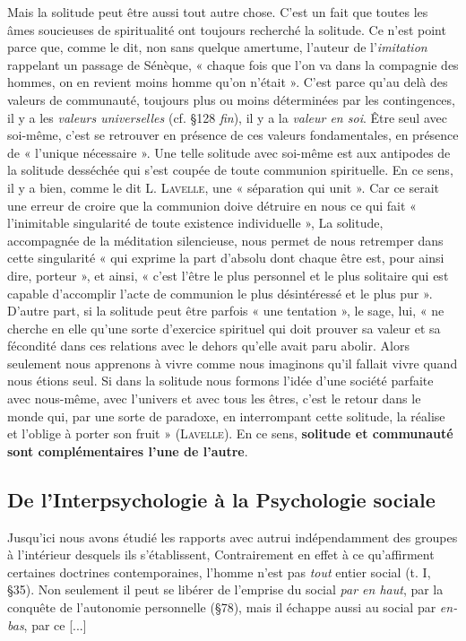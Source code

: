 Mais la solitude peut être aussi tout autre chose. C’est un fait que
toutes les âmes soucieuses de spiritualité ont toujours recherché la
solitude. Ce n’est point parce que, comme le dit, non sans quelque
amertume, l’auteur de l’{\it imitation} rappelant un passage de Sénèque,
« chaque fois que l’on va dans la compagnie des hommes, on en revient
moins homme qu’on n’était ». C’est parce qu’au delà des valeurs de
communauté, toujours plus ou moins déterminées par les contingences,
il y a les {\it valeurs universelles} (cf. \S 128 {\it fin}), il y a la {\it valeur en
soi}. Être seul avec soi-même, c’est se retrouver en présence de ces
valeurs fondamentales, en présence de « l’unique nécessaire ». Une
telle solitude avec soi-même est aux antipodes de la solitude desséchée
qui s’est coupée de toute communion spirituelle. En ce sens, il y a
bien, comme le dit L. \textsc{Lavelle}, une « séparation qui unit ». Car ce
serait une erreur de croire que la communion doive détruire en nous
ce qui fait « l’inimitable singularité de toute existence individuelle »,
La solitude, accompagnée de la méditation silencieuse, nous permet
de nous retremper dans cette singularité « qui exprime la part d’absolu
dont chaque être est, pour ainsi dire, porteur », et ainsi, « c’est l’être
le plus personnel et le plus solitaire qui est capable d'accomplir l'acte
de communion le plus désintéressé et le plus pur ». D’autre part, si la
solitude peut être parfois « une tentation », le sage, lui, « ne cherche
en elle qu’une sorte d’exercice spirituel qui doit prouver sa valeur et
sa fécondité dans ces relations avec le dehors qu’elle avait paru abolir.
Alors seulement nous apprenons à vivre comme nous imaginons qu’il
fallait vivre quand nous étions seul. Si dans la solitude nous formons
l’idée d’une société parfaite avec nous-même, avec l’univers et avec
tous les êtres, c’est le retour dans le monde qui, par une sorte de paradoxe,
en interrompant cette solitude, la réalise et l’oblige à porter
son fruit » (\textsc{Lavelle}). En ce sens, {\bf solitude et communauté sont
complémentaires l’une de l’autre}.

\subsection{De l’Interpsychologie à la Psychologie sociale}
Jusqu’ici
nous avons étudié les rapports avec autrui indépendamment
des groupes à l’intérieur desquels ils s’établissent, Contrairement en
effet à ce qu’affirment certaines doctrines contemporaines, l’homme
n’est pas {\it tout} entier social (t. I, \S 35). Non seulement il peut se libérer
de l’emprise du social {\it par en haut}, par la conquête de l'autonomie
personnelle (\S 78), mais il échappe aussi au social par {\it en-bas}, par ce [...]
